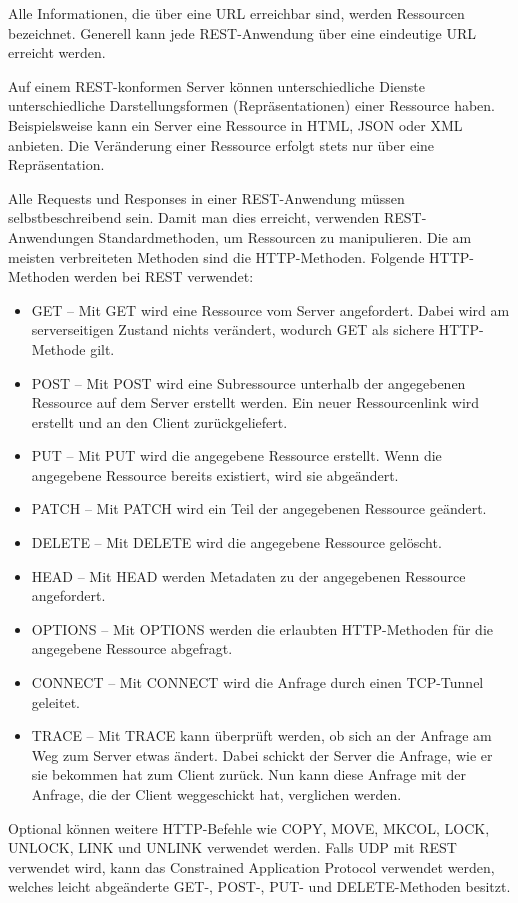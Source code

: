 \pagebreak


Alle Informationen, die über eine URL erreichbar sind, werden Ressourcen bezeichnet. Generell kann jede REST-Anwendung über eine eindeutige URL erreicht werden. \cite{WikiREST}


Auf einem REST-konformen Server können unterschiedliche Dienste unterschiedliche Darstellungsformen (Repräsentationen) einer Ressource haben. Beispielsweise kann ein Server eine Ressource in HTML, JSON oder XML anbieten. Die Veränderung einer Ressource erfolgt stets nur über eine Repräsentation. \cite{WikiREST}


Alle Requests und Responses in einer REST-Anwendung müssen selbstbeschreibend sein. Damit man dies erreicht, verwenden REST-Anwendungen Standardmethoden, um Ressourcen zu manipulieren. Die am meisten verbreiteten Methoden sind die HTTP-Methoden. Folgende HTTP-Methoden werden bei REST verwendet:

\begin{itemize}
    \item GET -- Mit GET wird eine Ressource vom Server angefordert. Dabei wird am serverseitigen Zustand nichts verändert, wodurch GET als sichere HTTP-Methode gilt.
    \item POST -- Mit POST wird eine Subressource unterhalb der angegebenen Ressource auf dem Server erstellt werden. Ein neuer Ressourcenlink wird erstellt und an den Client zurückgeliefert.
    \item PUT -- Mit PUT wird die angegebene Ressource erstellt. Wenn die angegebene Ressource bereits existiert, wird sie abgeändert. 
    \item PATCH -- Mit PATCH wird ein Teil der angegebenen Ressource geändert. 
    \item DELETE -- Mit DELETE wird die angegebene Ressource gelöscht.
    \item HEAD -- Mit HEAD werden Metadaten zu der angegebenen Ressource angefordert. 
    \item OPTIONS -- Mit OPTIONS werden die erlaubten HTTP-Methoden für die angegebene Ressource abgefragt. 
    \item CONNECT -- Mit CONNECT wird die Anfrage durch einen TCP-Tunnel geleitet. 
    \item TRACE -- Mit TRACE kann überprüft werden, ob sich an der Anfrage am Weg zum Server etwas ändert. Dabei schickt der Server die Anfrage, wie er sie bekommen hat zum Client zurück. Nun kann diese Anfrage mit der Anfrage, die der Client weggeschickt hat, verglichen werden. 
\end{itemize}

Optional können weitere HTTP-Befehle wie COPY, MOVE, MKCOL, LOCK, UNLOCK, LINK und UNLINK verwendet werden. Falls UDP mit REST verwendet wird, kann das Constrained Application Protocol verwendet werden, welches leicht abgeänderte GET-, POST-, PUT- und DELETE-Methoden besitzt. \cite{WikiREST}
